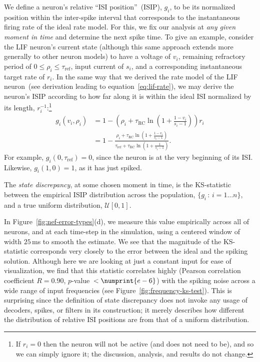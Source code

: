 We define a neuron's relative ``ISI position''~(ISIP), $g_i$, to be its normalized position within the inter-spike interval that corresponds to the instantaneous firing rate of the ideal rate model.
For this, we fix our analysis at \emph{any given moment in time} and determine the next spike time.
To give an example, consider the LIF neuron's current state (although this same approach extends more generally to other neuron models) to have a voltage of $v_i$, remaining refractory period of $0 \le \rho_i \le \tau_\text{ref}$, input current of $s_i$, and a corresponding instantaneous target rate of $r_i$.
In the same way that we derived the rate model of the LIF neuron~(see derivation leading to equation~\ref{eq:lif-rate}), we may derive the neuron's ISIP according to how far along it is within the ideal ISI normalized by its length, $r_i^{-1}$:\footnote{%
If $r_i = 0$ then the neuron will not be active (and does not need to be), and so we can simply ignore it; the discussion, analysis, and results do not change.}
\begin{equation} \label{eq:lif-isip}
\begin{aligned}
g_i(v_i, \rho_i) &= 1 - \left( \rho_i + \tau_\text{RC} \ln \left( 1 + \frac{1 - v_i}{s_i - 1} \right) \right) r_i \\
&= 1 - \frac{\rho_i + \tau_\text{RC} \ln \left( 1 + \frac{1 - v_i}{s_i - 1} \right)}{\tau_\text{ref} + \tau_\text{RC} \ln \left( 1 + \frac{1}{s_i - 1} \right)} \text{.}
\end{aligned}
\end{equation}
For example, $g_i(0, \tau_\text{ref}) = 0$, since the neuron is at the very beginning of its ISI.
Likewise, $g_i(1, 0) = 1$, as it has just spiked.

\begin{definition} \label{def:state-discrepancy}
The \emph{state discrepancy}, at some chosen moment in time, is the KS-statistic between the empirical ISIP distribution across the population, $\{g_i \, : \, i = 1 \ldots n\}$, and a true uniform distribution, $\mathcal{U}[0, 1]$.
\end{definition}

In Figure~\ref{fig:nef-error-types}(d), we measure this value empirically across all of neurons, and at each time-step in the simulation, using a centered window of width $25$\,ms to smooth the estimate.
We see that the magnitude of the KS-statistic corresponds very closely to the error between the ideal and the spiking solution.
Although here we are looking at just a constant input for ease of visualization, we find that this statistic correlates highly (Pearson correlation coefficient $R = 0.90$, $p$-value~$< \numprint{e-6}$) with the spiking noise across a wide range of input frequencies (see Figure~\ref{fig:frequency-ks-test}).
This is surprising since the definition of state discrepancy does not invoke any usage of decoders, spikes, or filters in its construction; it merely describes how different the distribution of relative ISI positions are from that of a uniform distribution.

